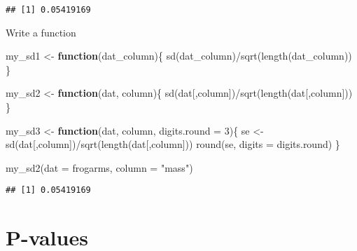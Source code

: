 \documentclass[
]{book}
\newenvironment{Shaded}{\begin{snugshade}}{\end{snugshade}}
\newcommand{\AttributeTok}[1]{\textcolor[rgb]{0.77,0.63,0.00}{#1}}
\newcommand{\ControlFlowTok}[1]{\textcolor[rgb]{0.13,0.29,0.53}{\textbf{#1}}}
\newcommand{\DecValTok}[1]{\textcolor[rgb]{0.00,0.00,0.81}{#1}}
\newcommand{\FunctionTok}[1]{\textcolor[rgb]{0.00,0.00,0.00}{#1}}
\newcommand{\NormalTok}[1]{#1}
\newcommand{\OtherTok}[1]{\textcolor[rgb]{0.56,0.35,0.01}{#1}}
\newcommand{\SpecialCharTok}[1]{\textcolor[rgb]{0.00,0.00,0.00}{#1}}
\newcommand{\StringTok}[1]{\textcolor[rgb]{0.31,0.60,0.02}{#1}}
\begin{document}
\begin{Shaded}
\end{Shaded}

\begin{verbatim}
## [1] 0.05419169
\end{verbatim}

Write a function

\begin{Shaded}
\begin{Highlighting}[]
\NormalTok{my\_sd1 }\OtherTok{\textless{}{-}} \ControlFlowTok{function}\NormalTok{(dat\_column)\{}
\FunctionTok{sd}\NormalTok{(dat\_column)}\SpecialCharTok{/}\FunctionTok{sqrt}\NormalTok{(}\FunctionTok{length}\NormalTok{(dat\_column))}
\NormalTok{\}}

\NormalTok{my\_sd2 }\OtherTok{\textless{}{-}} \ControlFlowTok{function}\NormalTok{(dat, column)\{}
\FunctionTok{sd}\NormalTok{(dat[,column])}\SpecialCharTok{/}\FunctionTok{sqrt}\NormalTok{(}\FunctionTok{length}\NormalTok{(dat[,column]))}
\NormalTok{\}}


\NormalTok{my\_sd3 }\OtherTok{\textless{}{-}} \ControlFlowTok{function}\NormalTok{(dat, column, }\AttributeTok{digits.round =} \DecValTok{3}\NormalTok{)\{}
\NormalTok{se }\OtherTok{\textless{}{-}} \FunctionTok{sd}\NormalTok{(dat[,column])}\SpecialCharTok{/}\FunctionTok{sqrt}\NormalTok{(}\FunctionTok{length}\NormalTok{(dat[,column]))}
\FunctionTok{round}\NormalTok{(se, }\AttributeTok{digits =}\NormalTok{ digits.round)}
\NormalTok{\}}
\end{Highlighting}
\end{Shaded}

\begin{Shaded}
\begin{Highlighting}[]
\FunctionTok{my\_sd2}\NormalTok{(}\AttributeTok{dat =}\NormalTok{ frogarms, }\AttributeTok{column =} \StringTok{"mass"}\NormalTok{)}
\end{Highlighting}
\end{Shaded}

\begin{verbatim}
## [1] 0.05419169
\end{verbatim}

\hypertarget{p-values}{%
\chapter{P-values}\label{p-values}}
\end{document}
